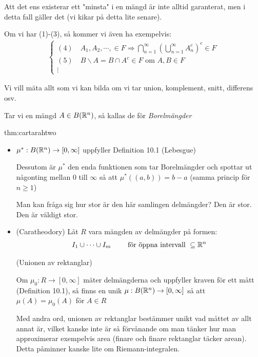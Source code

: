 \par\bigskip
\noindent Att det ens existerar ett "minsta" i en mängd är inte alltid garanterat, men i detta fall gäller det (vi kikar på detta lite senare).\par
\noindent Om vi har (1)-(3), så kommer vi även ha exempelvis:
\begin{equation*}
  \begin{gathered}
    \begin{cases}
      (4)\quad A_1,A_2,\cdots,\in F\Rightarrow\bigcap_{n=1}^{\infty}\left(\bigcup_{n=1}^{\infty}A_n^c\right)^c\in F\\
      (5)\quad B\backslash A = B\cap A^c \in F \text{ om } A,B\in F\\
      \vdots
    \end{cases}
  \end{gathered}
\end{equation*}
\par\bigskip
\noindent Vi vill mäta allt som vi kan bilda om vi tar union, komplement, snitt, differens osv.\par
\noindent Tar vi en mängd $A\in B(\mathbb{R}^n)$, så kallas de för \textit{Borelmängder}
\par\bigskip
\begin{theo}{thm:cartarahtwo}
  \begin{itemize}
    \item $\mu^*:B(\mathbb{R}^n)\to[0,\infty]$ uppfyller Definition 10.1 (Lebesgue)\par
      \noindent Dessutom är $\mu^*$ den enda funktionen som tar Borelmängder och spottar ut någonting mellan $0$ till $\infty$ så att $\mu^*((a,b)) = b-a$ (samma princip för $n\geq1$)
      \par\bigskip
      \noindent Man kan fråga sig hur stor är den här samlingen delmängder? Den är stor. Den är väldigt stor. 
    \item (Caratheodory) Låt $R$ vara mängden av delmängder på formen:
      \begin{equation*}
        \begin{gathered}
          I_1\cup\cdots\cup I_m\qquad\text{ för öppna intervall }\subseteq\mathbb{R}^n
        \end{gathered}
      \end{equation*}\par
      \noindent (Unionen av rektanglar)\par
      \noindent Om $\mu_0:R\to[0,\infty]$ mäter delmängderna och uppfyller kraven för ett mått (Definition 10.1), så finns en unik $\mu:B(\mathbb{R}^n)\to[0,\infty]$ så att $\mu(A) = \mu_0(A)$ för $A\in R$ 
      \par\bigskip
      \noindent Med andra ord, unionen av rektanglar bestämmer unikt vad måttet av allt annat är, vilket kanske inte är så förvånande om man tänker hur man approximerar exempelvis area (finare och finare rektanglar täcker arean). Detta påminner kanske lite om Riemann-integralen. 
  \end{itemize}
\end{theo}

